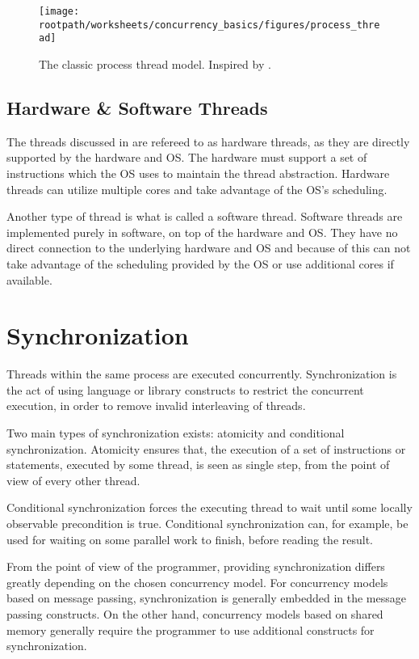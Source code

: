 \begin{figure}[htbp]
\centering
 \texttt{[image: \\rootpath/worksheets/concurrency\_basics/figures/process\_thread]} 
 \caption{The classic process thread model. Inspired by \cite[p. 99]{tanenbaum2008modern}.}
\label{fig:classic_process_thread}
\end{figure}


\subsection{Hardware \& Software Threads}
The threads discussed in  are refereed to as hardware threads, as they are directly supported by the hardware and \ac{OS}. The hardware must support a set of instructions which the \ac{OS} uses to maintain the thread abstraction. Hardware threads can utilize multiple cores and take advantage of the \ac{OS}'s scheduling.

Another type of thread is what is called a software thread. Software threads are implemented purely in software, on top of the hardware and \ac{OS}. They have no direct connection to the underlying hardware and \ac{OS} and because of this can not take advantage of the scheduling provided by the \ac{OS} or use additional cores if available. 

\section{Synchronization}\label{sec:synchronization}
Threads within the same process are executed concurrently. Synchronization is the act of using language or library constructs to restrict the concurrent execution, in order to remove invalid interleaving of threads\cite[p. 1989]{scott2011sync}.

Two main types of synchronization exists: atomicity and conditional synchronization. Atomicity ensures that, the execution of a set of instructions or statements, executed by some thread, is seen as single step, from the point of view of every other thread\cite[p. 1989]{scott2011sync}.

Conditional synchronization forces the executing thread to wait until some locally observable precondition is true\cite[p. 1989]{scott2011sync}. Conditional synchronization can, for example, be used for waiting on some parallel work to finish, before reading the result.

From the point of view of the programmer, providing synchronization differs greatly depending on the chosen concurrency model. For concurrency models based on message passing, synchronization is generally embedded in the message passing constructs. On the other hand, concurrency models based on shared memory generally require the programmer to use additional constructs for synchronization\cite[p. 1989]{scott2011sync}.

